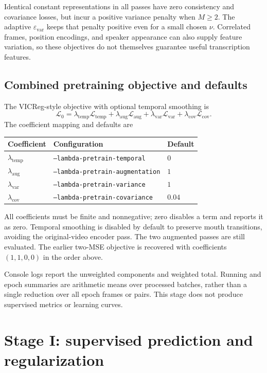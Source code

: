 \documentclass[11pt,a4paper]{article}
\newcommand{\eps}{\varepsilon}
\numberwithin{equation}{section}
\begin{document}
Identical constant representations in all passes have zero consistency
and covariance losses, but incur a positive variance penalty when
$M\geq2$. The adaptive
$\eps_{\mathrm{var}}$ keeps that penalty positive even for a small
chosen $\nu$. Correlated frames, position encodings, and speaker
appearance can also supply feature variation, so these objectives do
not themselves guarantee useful transcription features.

\subsection{Combined pretraining objective and defaults}

The VICReg-style objective with optional temporal smoothing is
\begin{equation}
\mathcal L_0
=\lambda_{\mathrm{temp}}\mathcal L_{\mathrm{temp}}
 +\lambda_{\mathrm{aug}}\mathcal L_{\mathrm{aug}}
 +\lambda_{\mathrm{var}}\mathcal L_{\mathrm{var}}
 +\lambda_{\mathrm{cov}}\mathcal L_{\mathrm{cov}}.
\label{eq:pretrain-total}
\end{equation}
The coefficient mapping and defaults are
\begin{center}
\begin{tabular}{lll}
Coefficient & Configuration & Default \\
\hline
$\lambda_{\mathrm{temp}}$ & \texttt{--lambda-pretrain-temporal} & $0$ \\
$\lambda_{\mathrm{aug}}$ & \texttt{--lambda-pretrain-augmentation} & $1$ \\
$\lambda_{\mathrm{var}}$ & \texttt{--lambda-pretrain-variance} & $1$ \\
$\lambda_{\mathrm{cov}}$ & \texttt{--lambda-pretrain-covariance} & $0.04$
\end{tabular}
\end{center}
All coefficients must be finite and nonnegative; zero disables a term
and reports it as zero. Temporal smoothing is disabled by default to
preserve mouth transitions, avoiding the original-video encoder pass.
The two augmented passes are still evaluated. The earlier two-MSE
objective is recovered with coefficients $(1,1,0,0)$ in the order above.

Console logs report the unweighted components and weighted total.
Running and epoch summaries are arithmetic means over processed
batches, rather than a single reduction over all epoch frames or pairs.
This stage does not produce supervised metrics or learning curves.

\section{Stage I: supervised prediction and regularization}
\end{document}
